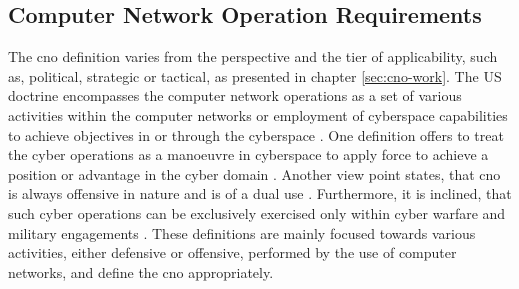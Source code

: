 \subsection{Computer Network Operation Requirements}
\label{sec:cno}
\glsresetall
The \gls{cno} definition varies from the perspective and the tier of applicability, such as, political, strategic or tactical, as presented in chapter \ref{sec:cno-work}.
The US doctrine encompasses the computer network operations as a set of various activities within the computer networks \cite{Leblanc2011} or employment of cyberspace capabilities to achieve objectives in or through the cyberspace \cite{USJCS2018}.
One definition offers to treat the cyber operations as a manoeuvre in cyberspace to apply force to achieve a position or advantage in the cyber domain \cite{Applegate2012}.
Another view point states, that \gls{cno} is always offensive in nature and is of a dual use \cite{Robinson2015}.
Furthermore, it is inclined, that such cyber operations can be exclusively exercised only within cyber warfare and military engagements \cite{Dewar2017}.
These definitions are mainly focused towards various activities, either defensive or offensive, performed by the use of computer networks, and define the \gls{cno} appropriately.

